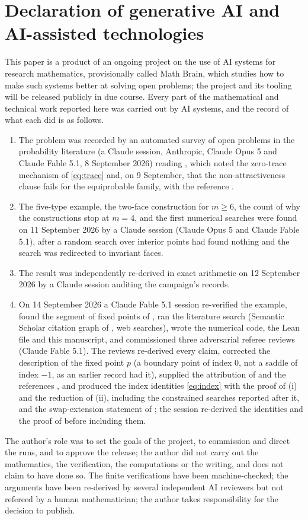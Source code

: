 \documentclass[11pt]{amsart}
\theoremstyle{definition}
\begin{document}
\section*{Declaration of generative AI and AI-assisted technologies}
This paper is a product of an ongoing project on the use of AI systems for research mathematics, provisionally called Math Brain, which studies how to make such systems better at solving open problems; the project and its tooling will be released publicly in due course. Every part of the mathematical and technical work reported here was carried out by AI systems, and the record of what each did is as follows.
\begin{enumerate}
\item The problem was recorded by an automated survey of open problems in the probability literature (a Claude session, Anthropic, Claude Opus 5 and Claude Fable 5.1, 8 September 2026) reading \cite{GR09}, which noted the zero-trace mechanism of \eqref{eq:trace} and, on 9 September, that the non-attractiveness clause fails for the equiprobable family, with the reference \cite{JLM17}.
\item The five-type example, the two-face construction for $m\ge6$, the count of why the constructions stop at $m=4$, and the first numerical searches were found on 11 September 2026 by a Claude session (Claude Opus 5 and Claude Fable 5.1), after a random search over interior points had found nothing and the search was redirected to invariant faces.
\item The result was independently re-derived in exact arithmetic on 12 September 2026 by a Claude session auditing the campaign's records.
\item On 14 September 2026 a Claude Fable 5.1 session re-verified the example, found the segment of fixed points of , ran the literature search (Semantic Scholar citation graph of \cite{GR09}, web searches), wrote the numerical code, the Lean file and this manuscript, and commissioned three adversarial referee reviews (Claude Fable 5.1). The reviews re-derived every claim, corrected the description of the fixed point $p$ (a boundary point of index $0$, not a saddle of index $-1$, as an earlier record had it), supplied the attribution of  and the references \cite{Jam16, Jam17}, and produced the index identities \eqref{eq:index} with the proof of (i) and the reduction of (ii), including the constrained searches reported after it, and the swap-extension statement of ; the session re-derived the identities and the proof of  before including them.
\end{enumerate}
The author's role was to set the goals of the project, to commission and direct the runs, and to approve the release; the author did not carry out the mathematics, the verification, the computations or the writing, and does not claim to have done so. The finite verifications have been machine-checked; the arguments have been re-derived by several independent AI reviewers but not refereed by a human mathematician; the author takes responsibility for the decision to publish.
\end{document}
